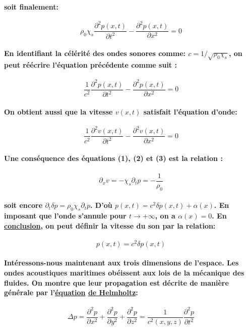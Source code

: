 \documentclass[a4paper,11pt]{article}
\begin{document}
\paragraph{\normalfont soit finalement:}
\[ \rho_0\chi_s \frac{\partial^{2} p(x,t)}{\partial t^{2}}-\frac{\partial^2 p(x,t)}{\partial x^2}=0\]
\paragraph{\normalfont En identifiant la c\'{e}l\'{e}rit\'{e} des ondes sonores comme: $c=1/\sqrt{\rho_0\chi_s}$, on peut r\'{e}\'{e}crire l'\'{e}quation pr\'{e}c\'{e}dente comme suit :}
\[ \frac{1}{c^{2}}\frac{\partial^{2} p(x,t)}{\partial t^{2}}-\frac{\partial^{2} p(x,t)}{\partial x^{2}}=0\]
\paragraph{\normalfont On obtient aussi que la vitesse $v(x,t)$ satisfait l'\'{e}quation d'onde:}
\[ \frac{1}{c^{2}}\frac{\partial^{2} v(x,t)}{\partial t^{2}}-\frac{\partial^{2} v(x,t)}{\partial x^{2}}=0\]
\paragraph{\normalfont Une cons\'{e}quence des \'{e}quations (1), (2) et (3) est la relation :}
\[\partial_xv=-\chi_s\partial_tp=-\frac{1}{\rho_0}\]
\paragraph{\normalfont soit encore $\partial_t\delta p=\rho_0\chi_s\partial_tp$. D'o\`{u} $p(x,t)=c^2\delta p(x,t)+\alpha(x)$. En imposant que l'onde s'annule pour $t\rightarrow +\infty$, on a $\alpha(x) = 0$. \newline
En \textbf{\underline{conclusion}}, on peut d\'{e}finir la vitesse du son par la relation:}
\[\boxed{p(x,t)=c^2\delta p(x,t)}\]
\paragraph{\normalfont Int\'{e}ressons-nous maintenant aux trois dimensions de l'espace. Les ondes acoustiques maritimes ob\'{e}issent aux lois de la m\'{e}canique des fluides. On montre que leur propagation est d\'{e}crite de mani\`{e}re g\'{e}n\'{e}rale par l'\textbf{\underline{\'{e}quation}} \textbf{\underline{de Helmholtz}}:}
\[\Delta p=\frac{\partial^2p}{\partial x^2}+\frac{\partial^2p}{\partial y^2}+\frac{\partial^2p}{\partial z^2}=\frac{1}{c^2(x,y,z)}\frac{\partial^2p}{\partial t^2}\]
\end{document}
